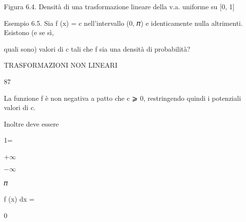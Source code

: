 \documentclass[a4paper,portrait,12pt]{article}
\begin{document}
\begin{flushleft}
Figura 6.4. Densit\`{a} di una trasformazione lineare della v.a. uniforme su [0, 1]
\end{flushleft}





\begin{flushleft}
Esempio 6.5. Sia f (x) = c nell'intervallo (0, 𝜋) e identicamente nulla altrimenti. Esistono (e se sì,
\end{flushleft}


\begin{flushleft}
quali sono) valori di c tali che f sia una densit\`{a} di probabilit\`{a}?
\end{flushleft}





\begin{flushleft}
 TRASFORMAZIONI NON LINEARI
\end{flushleft}





87





\begin{flushleft}
La funzione f \`{e} non negativa a patto che c ⩾ 0, restringendo quindi i potenziali valori di c.
\end{flushleft}


\begin{flushleft}
Inoltre deve essere
\end{flushleft}


1=





+$\infty$


$-$$\infty$





\begin{flushleft}
𝜋
\end{flushleft}





\begin{flushleft}
f (x) dx =
\end{flushleft}





0
\end{document}

